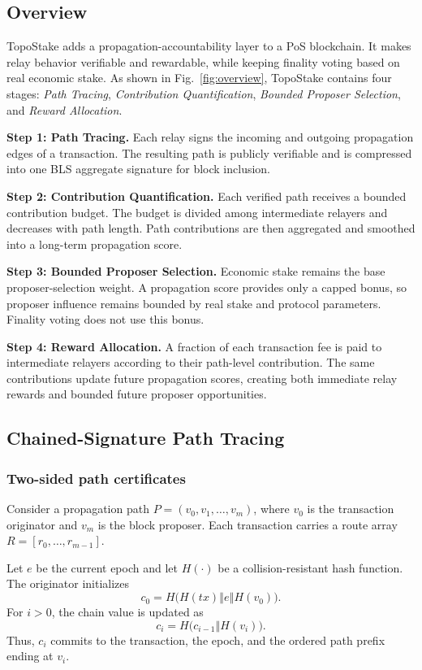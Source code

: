 \documentclass[lettersize,journal]{IEEEtran}
\begin{document}
\subsection{Overview}

TopoStake adds a propagation-accountability layer to a PoS blockchain.
It makes relay behavior verifiable and rewardable, while keeping finality voting based on real economic stake.
As shown in Fig.~\ref{fig:overview}, TopoStake contains four stages:
\emph{Path Tracing}, \emph{Contribution Quantification},
\emph{Bounded Proposer Selection}, and \emph{Reward Allocation}.

\textbf{Step 1: Path Tracing.}
Each relay signs the incoming and outgoing propagation edges of a transaction.
The resulting path is publicly verifiable and is compressed into one BLS aggregate signature for block inclusion.

\textbf{Step 2: Contribution Quantification.}
Each verified path receives a bounded contribution budget.
The budget is divided among intermediate relayers and decreases with path length.
Path contributions are then aggregated and smoothed into a long-term propagation score.

\textbf{Step 3: Bounded Proposer Selection.}
Economic stake remains the base proposer-selection weight.
A propagation score provides only a capped bonus, so proposer influence remains bounded by real stake and protocol parameters.
Finality voting does not use this bonus.

\textbf{Step 4: Reward Allocation.}
A fraction of each transaction fee is paid to intermediate relayers according to their path-level contribution.
The same contributions update future propagation scores, creating both immediate relay rewards and bounded future proposer opportunities.


\subsection{Chained-Signature Path Tracing}
\label{subsec:path-tracing}

\subsubsection{Two-sided path certificates}
Consider a propagation path
$P=(v_0,v_1,\dots,v_m)$,
where $v_0$ is the transaction originator and $v_m$ is the block proposer.
Each transaction carries a route array
$R=[r_0,\dots,r_{m-1}]$.

Let $e$ be the current epoch and let $H(\cdot)$ be a collision-resistant hash function.
The originator initializes
\begin{equation}
\label{eq:path_chain_init}
c_0 =
H\bigl(H(tx)\mathbin\Vert e\mathbin\Vert H(v_0)\bigr).
\end{equation}
For $i>0$, the chain value is updated as
\begin{equation}
\label{eq:path_chain_update}
c_i =
H\bigl(c_{i-1}\mathbin\Vert H(v_i)\bigr).
\end{equation}
Thus, $c_i$ commits to the transaction, the epoch, and the ordered path prefix ending at $v_i$.
\end{document}
